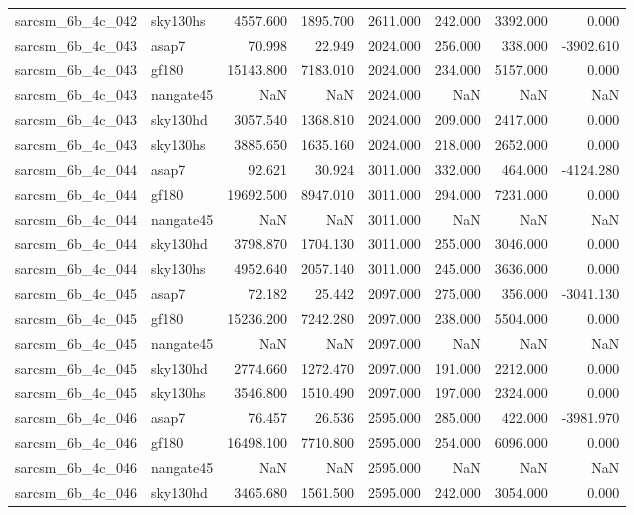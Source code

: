 \begin{tabular}{llrrrrrr}
sarcsm\_6b\_4c\_042 & sky130hs & 4557.600 & 1895.700 & 2611.000 & 242.000 & 3392.000 & 0.000 \\
sarcsm\_6b\_4c\_043 & asap7 & 70.998 & 22.949 & 2024.000 & 256.000 & 338.000 & -3902.610 \\
sarcsm\_6b\_4c\_043 & gf180 & 15143.800 & 7183.010 & 2024.000 & 234.000 & 5157.000 & 0.000 \\
sarcsm\_6b\_4c\_043 & nangate45 & NaN & NaN & 2024.000 & NaN & NaN & NaN \\
sarcsm\_6b\_4c\_043 & sky130hd & 3057.540 & 1368.810 & 2024.000 & 209.000 & 2417.000 & 0.000 \\
sarcsm\_6b\_4c\_043 & sky130hs & 3885.650 & 1635.160 & 2024.000 & 218.000 & 2652.000 & 0.000 \\
sarcsm\_6b\_4c\_044 & asap7 & 92.621 & 30.924 & 3011.000 & 332.000 & 464.000 & -4124.280 \\
sarcsm\_6b\_4c\_044 & gf180 & 19692.500 & 8947.010 & 3011.000 & 294.000 & 7231.000 & 0.000 \\
sarcsm\_6b\_4c\_044 & nangate45 & NaN & NaN & 3011.000 & NaN & NaN & NaN \\
sarcsm\_6b\_4c\_044 & sky130hd & 3798.870 & 1704.130 & 3011.000 & 255.000 & 3046.000 & 0.000 \\
sarcsm\_6b\_4c\_044 & sky130hs & 4952.640 & 2057.140 & 3011.000 & 245.000 & 3636.000 & 0.000 \\
sarcsm\_6b\_4c\_045 & asap7 & 72.182 & 25.442 & 2097.000 & 275.000 & 356.000 & -3041.130 \\
sarcsm\_6b\_4c\_045 & gf180 & 15236.200 & 7242.280 & 2097.000 & 238.000 & 5504.000 & 0.000 \\
sarcsm\_6b\_4c\_045 & nangate45 & NaN & NaN & 2097.000 & NaN & NaN & NaN \\
sarcsm\_6b\_4c\_045 & sky130hd & 2774.660 & 1272.470 & 2097.000 & 191.000 & 2212.000 & 0.000 \\
sarcsm\_6b\_4c\_045 & sky130hs & 3546.800 & 1510.490 & 2097.000 & 197.000 & 2324.000 & 0.000 \\
sarcsm\_6b\_4c\_046 & asap7 & 76.457 & 26.536 & 2595.000 & 285.000 & 422.000 & -3981.970 \\
sarcsm\_6b\_4c\_046 & gf180 & 16498.100 & 7710.800 & 2595.000 & 254.000 & 6096.000 & 0.000 \\
sarcsm\_6b\_4c\_046 & nangate45 & NaN & NaN & 2595.000 & NaN & NaN & NaN \\
sarcsm\_6b\_4c\_046 & sky130hd & 3465.680 & 1561.500 & 2595.000 & 242.000 & 3054.000 & 0.000 \\

\end{tabular}
